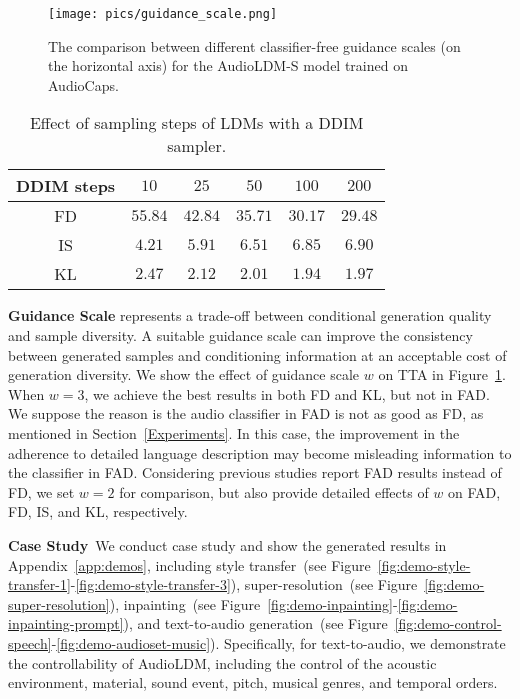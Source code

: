 \documentclass{article}
\begin{document}
\begin{figure}[tbp]
    \centering
    \texttt{[image: pics/guidance\_scale.png]}
    \caption{The comparison between different classifier-free guidance scales (on the horizontal axis) for the AudioLDM-S model trained on AudioCaps.}
    \label{fig:classifier-free-guidance}
    \vspace{-2mm}
\end{figure}

\begin{table}[tbp]
\centering
\small
\begin{tabular}{cccccc}
\toprule
DDIM steps    & $10$    & $25$      & $50$     & $100$     & $200$   \\
\midrule
FD    &   $55.84$    &    $42.84$     &    $35.71$    &    $30.17$     &   $\mathbf{29.48}$    \\
IS    &   $4.21$    &    $5.91$     &   $6.51$     &    $6.85$     & 
 $\mathbf{6.90} $      \\ KL    &   $2.47$    &    $2.12$     &   $2.01$     &    $\mathbf{1.94}$     & $1.97$      \\
\bottomrule
\end{tabular}
\caption{Effect of sampling steps of LDMs with a DDIM sampler.}
\label{tab: DDIMsampling}
\vspace{-6mm}
\end{table}

\textbf{Guidance Scale} 
represents a trade-off between conditional generation quality and sample diversity. A suitable guidance scale can improve the consistency between generated samples and conditioning information at an acceptable cost of generation diversity. We show the effect of guidance scale $w$ on TTA in Figure~\ref{fig:classifier-free-guidance}. When $w=3$, we achieve the best results in both FD and KL, but not in FAD. We suppose the reason is the audio classifier in FAD is not as good as FD, as mentioned in Section~\ref{Experiments}. In this case, the improvement in the adherence to detailed language description may become misleading information to the classifier in FAD. Considering previous studies report FAD results instead of FD, we set $w=2$ for comparison, but also provide detailed effects of $w$ on FAD, FD, IS, and KL, respectively. 

\textbf{Case Study}~We conduct case study and show the generated results in Appendix~\ref{app:demos}, including style transfer~(see Figure~\ref{fig:demo-style-transfer-1}-\ref{fig:demo-style-transfer-3}), super-resolution~(see Figure~\ref{fig:demo-super-resolution}), inpainting~(see Figure~\ref{fig:demo-inpainting}-\ref{fig:demo-inpainting-prompt}), and text-to-audio generation~(see Figure~\ref{fig:demo-control-speech}-\ref{fig:demo-audioset-music}). Specifically, for text-to-audio, we demonstrate the controllability of AudioLDM, including the control of the acoustic environment, material, sound event, pitch, musical genres, and temporal orders.
\end{document}
